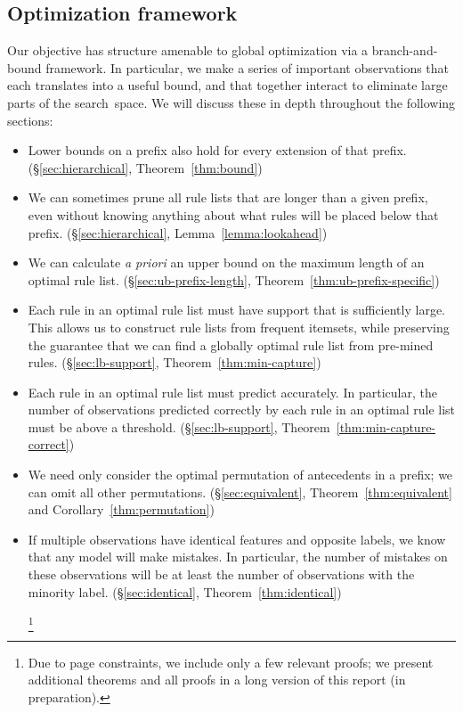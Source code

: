\subsection{Optimization framework}
\label{sec:optimization}

Our objective has structure amenable to global optimization via a branch-and-bound framework.
%
In particular, we make a series of important observations that each translates into
a useful bound, and that together interact to eliminate large parts of the search~space.
%
We will discuss these in depth throughout the following sections:
%
\begin{itemize}
\item Lower bounds on a prefix also hold for every extension of that prefix.
(\S\ref{sec:hierarchical}, Theorem~\ref{thm:bound})

\item We can sometimes prune all rule lists that are longer than a given prefix,
even without knowing anything about what rules will be placed below that prefix.
(\S\ref{sec:hierarchical}, Lemma~\ref{lemma:lookahead})

\item We can calculate \emph{a priori} an upper bound on the maximum length
of an optimal rule list.
(\S\ref{sec:ub-prefix-length}, Theorem~\ref{thm:ub-prefix-specific})

\item Each rule in an optimal rule list must have support that is sufficiently large.
%
This allows us to construct rule lists from frequent itemsets,
while preserving the guarantee that we can find a globally optimal
rule list from pre-mined rules.
(\S\ref{sec:lb-support}, Theorem~\ref{thm:min-capture})

\item Each rule in an optimal rule list must predict accurately.
%
In particular, the number of observations predicted correctly
by each rule in an optimal rule list must be above a threshold.
(\S\ref{sec:lb-support}, Theorem~\ref{thm:min-capture-correct})

\item We need only consider the optimal permutation of antecedents in a prefix;
we can omit all other permutations.
(\S\ref{sec:equivalent}, Theorem~\ref{thm:equivalent} and Corollary~\ref{thm:permutation})

\item  If multiple observations have identical features and opposite labels,
we know that any model will make mistakes.
%
In particular, the number of mistakes on these observations will be at least
the number of observations with the minority label.
(\S\ref{sec:identical}, Theorem~\ref{thm:identical})
\begin{kdd}
\footnote{Due to page constraints, we include only a few
relevant proofs; we present additional theorems and all proofs
in a long version of this report (in preparation).}
\end{kdd}
\end{itemize}


